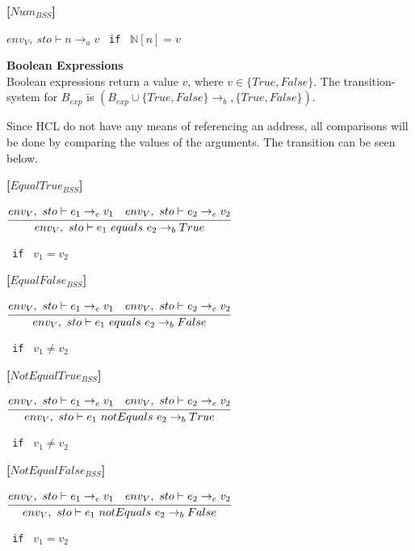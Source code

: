 \textbf{[$Num_{BSS}$]}
\begin{center}
	\begin{math}
		env_V,\ sto \vdash n \rightarrow_a v
	\end{math}
	\texttt{ if } $\mathbb{N}[n] = v$
\end{center}

\textbf{\large{Boolean Expressions}}\\
Boolean expressions return a value $v$, where $v \in \{True, False\}$.
The transition-system for $B_{exp}$ is $(B_{exp} \cup \{True, False\} \rightarrow_b, \{True, False\})$.

Since HCL do not have any means of referencing an address, all comparisons will be done by comparing the values of the arguments.
The transition can be seen below.

\textbf{[$EqualTrue_{BSS}$]}
\begin{center}
	\begin{math}
	\cfrac
	{env_V,\ sto \vdash e_1 \rightarrow_e v_1 \quad env_V,\ sto \vdash e_2 \rightarrow_e v_2}
	{env_V,\ sto \vdash e_1\ equals\ e_2 \rightarrow_b True}
	\end{math}
	
	\texttt{ if } $v_1 = v_2$
\end{center}

\textbf{[$EqualFalse_{BSS}$]}
\begin{center}
	\begin{math}
	\cfrac
	{env_V,\ sto \vdash e_1 \rightarrow_e v_1 \quad env_V,\ sto \vdash e_2 \rightarrow_e v_2}
	{env_V,\ sto \vdash e_1\ equals\ e_2 \rightarrow_b False}
	\end{math}
	
	\texttt{ if } $v_1 \neq v_2$
\end{center}

\textbf{[$NotEqualTrue_{BSS}$]}
\begin{center}
	\begin{math}
	\cfrac
	{env_V,\ sto \vdash e_1 \rightarrow_e v_1 \quad env_V,\ sto \vdash e_2 \rightarrow_e v_2}
	{env_V,\ sto \vdash e_1\ notEquals\ e_2 \rightarrow_b True}
	\end{math}
	
	\texttt{ if } $v_1 \neq v_2$
\end{center}

\textbf{[$NotEqualFalse_{BSS}$]}
\begin{center}
	\begin{math}
	\cfrac
	{env_V,\ sto \vdash e_1 \rightarrow_e v_1 \quad env_V,\ sto \vdash e_2 \rightarrow_e v_2}
	{env_V,\ sto \vdash e_1\ notEquals\ e_2 \rightarrow_b False}
	\end{math}
	
	\texttt{ if } $v_1 = v_2$
\end{center}

